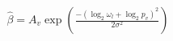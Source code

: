 \begin{align}
\hat{\beta} = A_v \exp\left(\frac{-(\log_2\omega_l+\log_2p_v)^2}{2\sigma^2} \right)
\end{align}
